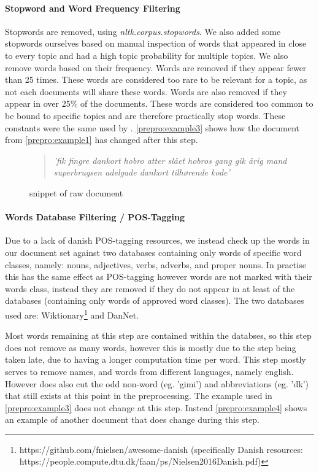 \paragraph{Stopword and Word Frequency Filtering}
Stopwords are removed, using \emph{nltk.corpus.stopwords}. We also added some stopwords ourselves based on manual inspection of words that appeared in close to every topic and had a high topic probability for multiple topics.
We also remove words based on their frequency. 
Words are removed if they appear fewer than 25 times.
These words are considered too rare to be relevant for a topic, as not each documents will share these words.
Words are also removed if they appear in over 25\% of the documents.
These words are considered too common to be bound to specific topics and are therefore practically stop words.
These constants were the same used by \cite{quanti}.
\autoref{prepro:example3} shows how the document from \autoref{prepro:example1} has changed after this step.
\begin{figure}[h]
	\begin{quote}
		\textit{
			'fik fingre dankort hobro atter slået hobros gang gik årig mand superbrugsen adelgade dankort tilhørende kode'
		}
	\end{quote}
	\caption{snippet of raw document}
	\label{prepro:example3}
\end{figure}


\paragraph{Words Database Filtering / POS-Tagging}
Due to a lack of danish POS-tagging resources, we instead check up the words in our document set against two databases containing only words of specific word classes, namely: nouns, adjectives, verbs, adverbs, and proper nouns.
In practise this has the same effect as POS-tagging however words are not marked with their words class, instead they are removed if they do not appear in at least of the databases (containing only words of approved word classes).
The two databases used are:  Wiktionary\footnote{https://github.com/fnielsen/awesome-danish (specifically Danish resources: https://people.compute.dtu.dk/faan/ps/Nielsen2016Danish.pdf)} and DanNet\cite{Pedersen2009DanNetTC}. 

Most words remaining at this step are contained within the databses, so this step does not remove as many words, however this is mostly due to the step being taken late, due to having a longer computation time per word.
This step mostly serves to remove names, and words from different languages, namely english.
However does also cut the odd non-word (eg. 'gimi') and abbreviations (eg. 'dk') that still exists at this point in the preprocessing.
The example used in \autoref{prepro:example3} does not change at this step. Instead \autoref{prepro:example4} shows an example of another document that does change during this step.


